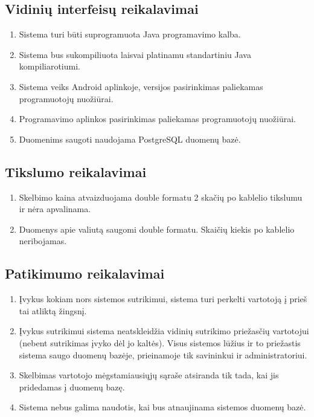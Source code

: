 \documentclass[12pt]{article}
\renewcommand{\thesubsection}{FR\arabic{subsection}}
\renewcommand*{\theenumi}{\thesubsection.\arabic{enumi}}
\renewcommand*{\theenumii}{\thesubsubsection.\theenumi.\arabic{enumii}}
\begin{document}
	\subsection{Vidinių interfeisų reikalavimai}
	\begin{enumerate}[labelindent=10pt,leftmargin=2.2cm]
		\item Sistema turi būti suprogramuota Java programavimo kalba.
		\item Sistema bus sukompiliuota laisvai platinamu standartiniu Java kompiliarotiumi.
		\item Sistema veiks Android aplinkoje, versijos pasirinkimas paliekamas programuotojų nuožiūrai.
		\item Programavimo aplinkos pasirinkimas paliekamas programuotojų nuožiūrai.
		\item Duomenims saugoti naudojama PostgreSQL duomenų bazė.
	\end{enumerate}	
	
	
	\subsection{Tikslumo reikalavimai}
	\begin{enumerate}[labelindent=10pt,leftmargin=2.2cm]
		\item Skelbimo kaina atvaizduojama double formatu 2 skačių po kablelio tikslumu ir nėra apvalinama.
		\item Duomenys apie valiutą saugomi double formatu. Skaičių kiekis po kablelio neribojamas.
	\end{enumerate}	
	
	\subsection{Patikimumo reikalavimai}
	\begin{enumerate}[labelindent=10pt,leftmargin=2.2cm]
		\item Įvykus kokiam nors sistemos sutrikimui, sistema turi perkelti vartotoją į prieš tai atliktą žingsnį.
		\item Įvykus sutrikimui sistema neatskleidžia vidinių sutrikimo priežasčių vartotojui (nebent sutrikimas įvyko dėl jo kaltės). Visus sistemos lūžius ir to priežastis sistema saugo duomenų bazėje, prieinamoje tik savininkui ir administratoriui.
		\item Skelbimas vartotojo mėgstamiausiųjų sąraše atsiranda tik tada, kai jis pridedamas į duomenų bazę.
		\item Sistema nebus galima naudotis, kai bus atnaujinama sistemos duomenų bazė.
	\end{enumerate}	
	
\end{document}
